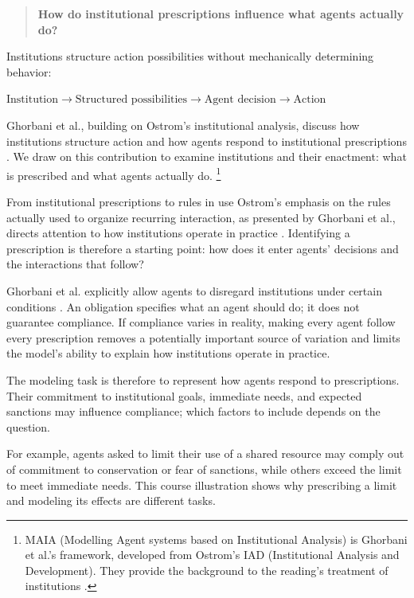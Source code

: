\documentclass[11pt,a4paper]{article}
\newenvironment{fitdisplay}{\par\medskip\noindent\begin{lrbox}{\displaybox}$\displaystyle}{%
$\end{lrbox}\makebox[\linewidth][c]{\ifdim\wd\displaybox>\linewidth\resizebox{\linewidth}{!}{\usebox{\displaybox}}\else\usebox{\displaybox}\fi}\par\medskip}
\begin{document}
\begin{quote}
\textbf{How do institutional prescriptions influence what agents actually do?}
\end{quote}

Institutions structure action possibilities without mechanically determining behavior:

\begin{fitdisplay}
\boxed{
\text{Institution}
\rightarrow
\text{Structured possibilities}
\rightarrow
\text{Agent decision}
\rightarrow
\text{Action}
}
\end{fitdisplay}

Ghorbani et al., building on Ostrom's institutional analysis, discuss how institutions structure action and how agents respond to institutional prescriptions \cite{ghorbani}. We draw on this contribution to examine institutions and their enactment: what is prescribed and what agents actually do. \footnote{MAIA (Modelling Agent systems based on Institutional Analysis) is Ghorbani et al.'s framework, developed from Ostrom's IAD (Institutional Analysis and Development). They provide the background to the reading's treatment of institutions \cite{ghorbani}.}

\begin{principle}{From institutional prescriptions to rules in use}
Ostrom's emphasis on the rules actually used to organize recurring interaction, as presented by Ghorbani et al., directs attention to how institutions operate in practice \cite[sec.~2.3]{ghorbani}. Identifying a prescription is therefore a starting point: how does it enter agents' decisions and the interactions that follow?

Ghorbani et al. explicitly allow agents to disregard institutions under certain conditions \cite[sec.~2.4]{ghorbani}. An obligation specifies what an agent should do; it does not guarantee compliance. If compliance varies in reality, making every agent follow every prescription removes a potentially important source of variation and limits the model's ability to explain how institutions operate in practice.
\end{principle}

The modeling task is therefore to represent how agents respond to prescriptions. Their commitment to institutional goals, immediate needs, and expected sanctions may influence compliance; which factors to include depends on the question.

For example, agents asked to limit their use of a shared resource may comply out of commitment to conservation or fear of sanctions, while others exceed the limit to meet immediate needs. This course illustration shows why prescribing a limit and modeling its effects are different tasks.
\end{document}
